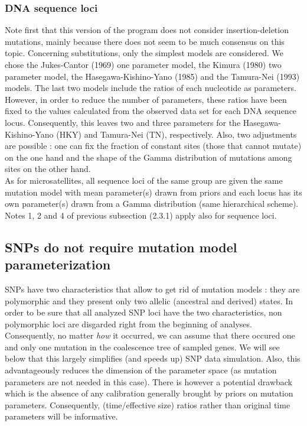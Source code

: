 \subsubsection{DNA sequence loci}

Note first that this version of the program does not consider insertion-deletion mutations, mainly because there does not seem to be much consensus on this topic. Concerning substitutions, only the simplest models are considered. We chose the Jukes-Cantor (1969) one parameter model, the Kimura (1980) two parameter model, the Hasegawa-Kishino-Yano (1985) and the Tamura-Nei (1993) models. The last two models include the ratios of each nucleotide  as parameters. However, in order to reduce the number of parameters, these ratios have been fixed to the values calculated from the observed data set for each DNA sequence locus. Consequently, this leaves two and three parameters for the Hasegawa-Kishino-Yano (HKY) and Tamura-Nei (TN), respectively.
Also, two adjustments are possible : one can fix the fraction of constant sites (those that cannot mutate) on the one hand and the shape of the Gamma distribution of mutations among sites on the other hand.\\
As for microsatellites, all sequence loci of the same group are given the same mutation model with mean parameter(s) drawn from priors and each locus has its own parameter(s) drawn from a Gamma distribution (same hierarchical scheme). Notes 1, 2 and 4 of previous subsection (2.3.1) apply also for sequence loci.

\subsection{SNPs do not require mutation model parameterization}

SNPs have two characteristics that allow to get rid of mutation models : they are polymorphic and they present only two allelic (ancestral and derived) states. In order to be sure that all analyzed SNP loci have the two characteristics, non polymorphic loci are disgarded right from the beginning of analyses. Consequently, no matter \emph{how} it occurred, we can assume that there occured one and only one mutation in the coalescence tree of sampled genes. We will see below that this  largely simplifies (and speeds up) SNP data simulation. Also, this advantageously reduces the dimension of the parameter space (as mutation parameters are not needed in this case). There is however a potential drawback which is the absence of any calibration generally brought by priors on mutation parameters. Consequently, (time/effective size) ratios rather than original time parameters will be informative.  

